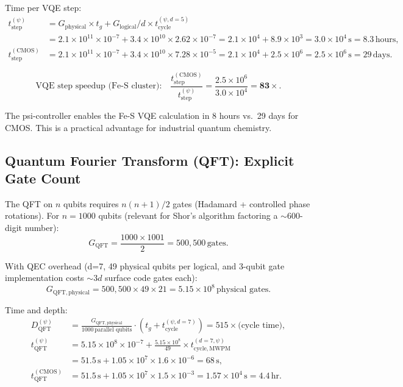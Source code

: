 \documentclass[11pt]{article}
\theoremstyle{definition}
\theoremstyle{remark}
\begin{document}
Time per VQE step:
\begin{align}
t_{\mathrm{step}}^{(\psi)} &= G_{\mathrm{physical}}\times t_g + G_{\mathrm{logical}}/d\times t_{\mathrm{cycle}}^{(\psi,d=5)} \nonumber\\
&= 2.1\times10^{11}\times10^{-7} + 3.4\times10^{10}\times2.62\times10^{-7}
= 2.1\times10^4 + 8.9\times10^3 = 3.0\times10^4\,\text{s} = 8.3\,\text{hours}, \\
t_{\mathrm{step}}^{(\mathrm{CMOS})} &= 2.1\times10^{11}\times10^{-7}
+ 3.4\times10^{10}\times7.28\times10^{-5}
= 2.1\times10^4 + 2.5\times10^6 = 2.5\times10^6\,\text{s} = 29\,\text{days}.
\end{align}

\begin{equation}
\boxed{
\text{VQE step speedup (Fe-S cluster):} \quad
\frac{t_{\mathrm{step}}^{(\mathrm{CMOS})}}{t_{\mathrm{step}}^{(\psi)}}
= \frac{2.5\times10^6}{3.0\times10^4} = \mathbf{83\times}.
}
\label{eq:vqe_speedup}
\end{equation}

The psi-controller enables the Fe-S VQE calculation in 8 hours vs.\ 29 days
for CMOS. This is a practical advantage for industrial quantum chemistry.

\subsection{Quantum Fourier Transform (QFT): Explicit Gate Count}

The QFT on $n$ qubits requires $n(n+1)/2$ gates (Hadamard + controlled
phase rotations). For $n = 1000$ qubits (relevant for Shor's algorithm
factoring a $\sim 600$-digit number):
\begin{equation}
G_{\mathrm{QFT}} = \frac{1000\times1001}{2} = 500{,}500\,\text{gates}.
\end{equation}

With QEC overhead (d=7, 49 physical qubits per logical, and 3-qubit gate
implementation costs $\sim 3d$ surface code gates each):
\begin{equation}
G_{\mathrm{QFT,physical}} = 500{,}500\times49\times21 = 5.15\times10^8\,\text{physical gates}.
\end{equation}

Time and depth:
\begin{align}
D_{\mathrm{QFT}}^{(\psi)} &= \frac{G_{\mathrm{QFT,physical}}}{1000\,\text{parallel qubits}}
\cdot(t_g + t_{\mathrm{cycle}}^{(\psi,d=7)}) = 515\times\text{(cycle time)}, \\
t_{\mathrm{QFT}}^{(\psi)} &= 5.15\times10^8\times10^{-7}
+ \frac{5.15\times10^8}{49}\times t_{\mathrm{cycle,MWPM}}^{(d=7,\psi)} \\
&= 51.5\,\text{s} + 1.05\times10^7\times1.6\times10^{-6} = 68\,\text{s}, \\
t_{\mathrm{QFT}}^{(\mathrm{CMOS})} &= 51.5\,\text{s}
+ 1.05\times10^7\times1.5\times10^{-3} = 1.57\times10^4\,\text{s} = 4.4\,\text{hr}.
\end{align}
\end{document}
